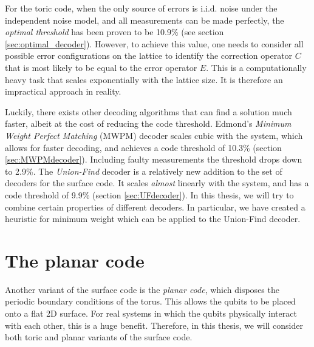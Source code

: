 For the toric code, when the only source of errors is i.i.d. noise under the independent noise model, and all measurements can be made perfectly, the \emph{optimal threshold} has been proven to be 10.9\% (see section \ref{sec:optimal_decoder}). However, to achieve this value, one needs to consider all possible error configurations on the lattice to identify the correction operator $C$ that is most likely to be equal to the error operator $E$. This is a computationally heavy task that scales exponentially with the lattice size. It is therefore an impractical approach in reality.

Luckily, there exists other decoding algorithms that can find a solution much faster, albeit at the cost of reducing the code threshold. Edmond's \emph{Minimum Weight Perfect Matching} (MWPM) decoder scales cubic with the system, which allows for faster decoding, and achieves a code threshold of 10.3\% (section \ref{sec:MWPMdecoder}). Including faulty measurements the threshold drops down to 2.9\%. The \emph{Union-Find} decoder is a relatively new addition to the set of decoders for the surface code. It scales \emph{almost} linearly with the system, and has a code threshold of 9.9\% (section \ref{sec:UFdecoder}). In this thesis, we will try to combine certain properties of different decoders. In particular, we have created a heuristic for minimum weight which can be applied to the Union-Find decoder.

\section{The planar code}\label{sec:surface_planar}

Another variant of the surface code is the \emph{planar code}, which disposes the periodic boundary conditions of the torus. This allows the qubits to be placed onto a flat 2D surface. For real systems in which the qubits physically interact with each other, this is a huge benefit. Therefore, in this thesis, we will consider both toric and planar variants of the surface code.



\def\QS{15}
\def\s{1.5}


